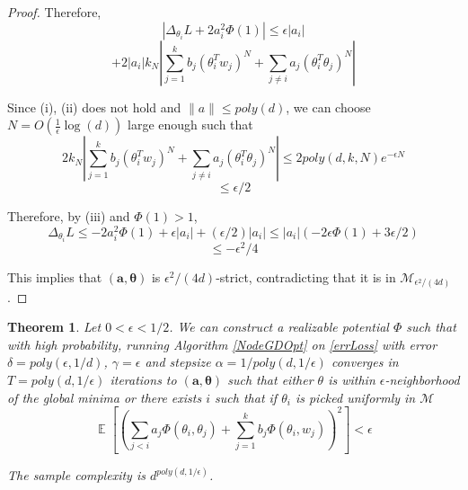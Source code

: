 \documentclass{article}
\newtheorem{theorem}{Theorem}[section]
\DeclareMathOperator*{\expt}{\mathbb{E}}
\begin{document}
\begin{proof}
Therefore,
%
\[|\Delta_{\theta_i}L + 2a_i^2\Phi(1)| \leq \epsilon |a_i| \]
\[+  2|a_i| k_N|\sum_{j=1}^k b_j (\theta_i^Tw_j)^N +  \sum_{j\neq i}  a_j(\theta_i^T\theta_j)^N|\]

Since (i), (ii) does not hold and $\|a\| \leq poly(d)$, we can choose $N = O(\frac{1}{\epsilon}\log(d))$ large enough such that 
%
\[ 2k_N |\sum_{j=1}^k b_j (\theta_i^Tw_j)^N +  \sum_{j\neq i}  a_j(\theta_i^T\theta_j)^N| \leq  2poly(d,k,N)e^{-\epsilon N} \]
\[\leq \epsilon/2\] 

Therefore, by (iii) and $\Phi(1) > 1$,
%
\[\Delta_{\theta_i} L \leq -2a_i^2 \Phi(1) +\epsilon |a_i|+(\epsilon/2)|a_i| \leq |a_i|(-2\epsilon \Phi(1) + 3\epsilon/2) \]
\[\leq -\epsilon^2/4\]

This implies that $(\boldsymbol{a,\theta})$ is $\epsilon^2/(4d)$-strict, contradicting that it is in $\mathcal{M}_{\epsilon^2/(4d)}$. 
\end{proof}


\begin{theorem}
Let  $0 < \epsilon < 1/2$. We can construct a realizable potential $\Phi$ such that with high probability, running Algorithm \ref{NodeGDOpt} on \eqref{errLoss} with error $\delta = poly(\epsilon,1/d)$, $\gamma = \epsilon$ and stepsize $\alpha = 1/poly(d,1/\epsilon)$ converges in $T = poly(d, 1/\epsilon)$ iterations to $(\boldsymbol{a,\theta})$ such that either  $\theta$ is within $\epsilon$-neighborhood of the global minima or there exists $i$ such that if $\theta_i$ is picked uniformly in $\mathcal{M}$
%
\[ \expt\left[\left( \sum_{j < i} a_j \Phi(\theta_i,\theta_j) + \sum_{j=1}^k b_j \Phi(\theta_i,w_j)\right)^2\right] < \epsilon\]

The sample complexity is $d^{poly(d,1/\epsilon)}$.
\end{theorem}
\end{document}
